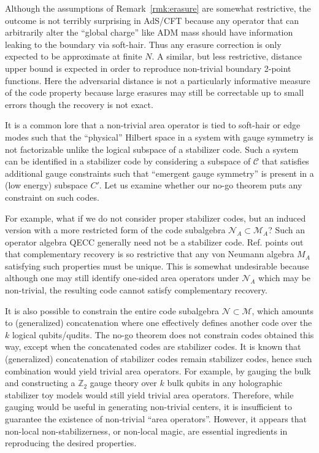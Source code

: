 \documentclass[%
 reprint,
superscriptaddress,
nofootinbib,
 amsmath,amssymb,
 aps,
prx,
floatfix,
]{revtex4-2}
\theoremstyle{definition}
\numberwithin{equation}{section}
\begin{document}
Although the assumptions of Remark~\ref{rmk:erasure} are somewhat restrictive, the outcome is not terribly surprising in AdS/CFT because any operator that can arbitrarily alter the ``global charge'' like ADM mass should have information leaking to the boundary via soft-hair. Thus any erasure correction is only expected to be approximate at finite $N$. A similar, but less restrictive, distance upper bound is expected in order to reproduce non-trivial boundary 2-point functions\cite{HMERA}. Here the adversarial distance is not a particularly informative measure of the code property because large erasures may still be correctable up to small errors though the recovery is not exact.

It is a common lore that a non-trivial area operator is tied to soft-hair or edge modes such that the ``physical'' Hilbert space in a system with gauge symmetry is not factorizable unlike the logical subspace of a stabilizer code\cite{Buividovich:2008gq,Donnelly:2011hn,Casini:2013rba,Lin:2017uzr}. Such a system can be identified in a stabilizer code by considering a subspace of $\mathcal{C}$ that satisfies additional gauge constraints such that ``emergent gauge symmetry'' is present in a (low energy) subspace $C'$\cite{Levin:2004mi,Dolev:2021ofc,Qi:2022lbd}. Let us examine whether our no-go theorem puts any constraint on such codes. 


For example, what if we do not consider proper stabilizer codes, but an induced version with a more  restricted form of the code subalgebra $\mathcal{N}_A\subset \mathcal{M}_A$? Such an operator algebra QECC generally need not be a stabilizer code. Ref. \cite{Pollack:2021yij} points out that complementary recovery is so restrictive that any von Neumann algebra $M_A$ satisfying such properties must be unique. This is somewhat undesirable because although one may still identify one-sided area operators under $\mathcal{N}_A$ which may be non-trivial, the resulting code cannot satisfy complementary recovery. 

It is also possible to constrain the entire code subalgebra $\mathcal{N}\subset\mathcal{M}$, which amounts to (generalized) concatenation where one effectively defines another code over the $k$ logical qubits/qudits. The no-go theorem does not constrain codes obtained this way, except when the concatenated codes are stabilizer codes. It is known that (generalized) concatenation of stabilizer codes remain stabilizer codes\cite{QL}, hence such combination would yield trivial area operators. For example, by gauging the bulk and constructing a $\mathbb{Z}_2$ gauge theory over $k$ bulk qubits in any holographic stabilizer toy models would still yield trivial area operators. Therefore, while gauging would be useful in generating non-trivial centers, it is insufficient to guarantee the existence of non-trivial ``area operators''. However, it appears that non-local non-stabilizerness, or non-local magic, are essential ingredients in reproducing the desired properties.  
\end{document}
